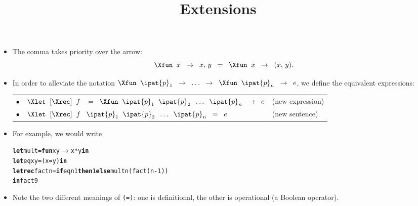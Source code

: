 \documentclass[wide]{slides}
\begin{document}
\begin{slide}
  \title{Extensions}

  \begin{itemize}

    \item The comma takes priority over the arrow:
      \begin{equation*}
        \Xfun \;\; x \;\;
        \rightarrow \;\; x, \, y \;\; = \;\;
        \Xfun \;\; x \;\; \rightarrow \;\; (x,\,y).
      \end{equation*}

    \item In order to alleviate the notation $\Xfun \;\; \ipat{p}_1
      \;\; \rightarrow \;\; \ldots \;\; \rightarrow \;\; \Xfun \;\;
      \ipat{p}_n \;\; \rightarrow \;\; e$, we define the equivalent
      expressions:\\
      \smallskip
      \begin{tabular}{r@{\,\,}ll@{}}
        $\bullet$
        & $\Xlet \;\;
          \textrm{[}\Xrec\textrm{]} \;\; f \;\;\;
          = \;\; \Xfun \;\; \ipat{p}_1 \;\; \ipat{p}_2 \;\; \ldots \;\;
          \ipat{p}_n \;\; \rightarrow \;\; e$
        & (new expression)\\
        $\bullet$
        & $\Xlet \;\;
          \textrm{[}\Xrec\textrm{]} \;\; f
          \;\;\; \ipat{p}_1 \;\; \ipat{p}_2 \;\; \ldots \;\; \ipat{p}_n
          \;\; = \;\; e$
        & (new sentence)
      \end{tabular}

    \item For example, we would write
\begin{alltt}
\textbf{let} mult = \textbf{fun} x y \(\rightarrow\) x * y \textbf{in}
\textbf{let} eq x y = (x = y) \textbf{in}
\textbf{let rec} fact n = \textbf{if} eq n 1 \textbf{then} 1 \textbf{else} mult n (fact(n-1))
\textbf{in} fact 9
\end{alltt}

      \item Note the two different meanings of \texttt{(=)}: one is
        definitional, the other is operational (a Boolean operator).

  \end{itemize}

\end{slide}
\end{document}
